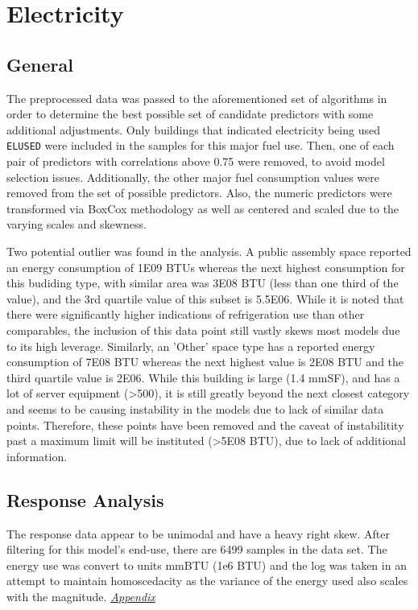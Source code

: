 \section{Electricity}
\label{sec:electricity}

\subsection{General}

The preprocessed data was passed to the aforementioned set of algorithms in order to determine the best possible set of candidate predictors with some additional adjustments.  Only buildings that indicated electricity being used \lstinline{ELUSED} were included in the samples for this major fuel use.  Then, one of each pair of predictors with correlations above 0.75 were removed, to avoid model selection issues. Additionally, the other major fuel consumption values were removed from the set of possible predictors.  Also, the numeric predictors were transformed via BoxCox methodology as well as centered and scaled due to the varying scales and skewness.

Two potential outlier was found in the analysis. A public assembly space reported an energy consumption of 1E09 BTUs whereas the next highest consumption for this budiding type, with similar area was 3E08 BTU (less than one third of the value), and the 3rd quartile value of this subset is 5.5E06.  While it is noted that there were significantly higher indications of refrigeration use than other comparables, the inclusion of this data point still vastly skews most models due to its high leverage.  Similarly, an 'Other' space type has a reported energy consumption of 7E08 BTU whereas the next highest value is 2E08 BTU and the third quartile value is 2E06.  While this building is large (1.4 mmSF), and has a lot of server equipment (>500), it is still greatly beyond the next closest category and seems to be causing instability in the models due to lack of similar data points.  Therefore, these points have been removed and the caveat of instabilitity past a maximum limit will be instituted (>5E08 BTU), due to lack of additional information.

\subsection{Response Analysis}

The response data appear to be unimodal and have a heavy right skew.  After filtering for this model's end-use, there are 6499 samples in the data set.  The energy use was convert to units mmBTU (1e6 BTU) and the log was taken in an attempt to maintain homoscedacity as the variance of the energy used also scales with the magnitude.  \textit{\hyperref[appendix:electricity:response]{Appendix}}

